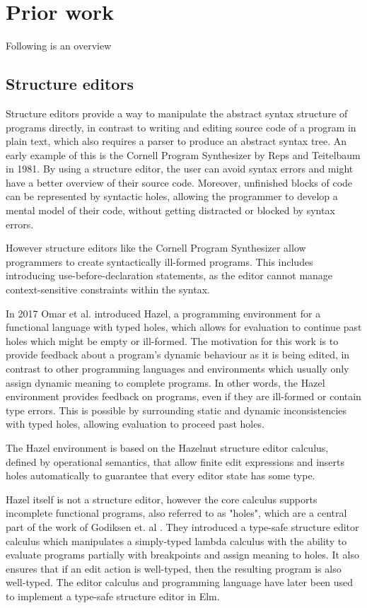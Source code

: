 \section{Prior work}
Following is an overview

\subsection{Structure editors}
Structure editors provide a way to manipulate the abstract syntax structure of programs directly, in contrast to writing and editing source code of a program in plain text, which also requires a parser to produce an abstract syntax tree. An early example of this is the Cornell Program Synthesizer by Reps and Teitelbaum\cite{timtom81} in 1981.
By using a structure editor, the user can avoid syntax errors and might have a better overview of their source code. Moreover, unfinished blocks of code can be represented by syntactic holes, allowing the programmer to develop a mental model of their code, without getting distracted or blocked by syntax errors.

However structure editors like the Cornell Program Synthesizer\cite{timtom81} allow programmers to create syntactically ill-formed programs. This includes introducing use-before-declaration statements, as the editor cannot manage context-sensitive constraints within the syntax.

In 2017 Omar et al. introduced Hazel\cite{omar}, a programming environment for a functional language with typed holes, which allows for evaluation to continue past holes which might be empty or ill-formed. The motivation for this work is to provide feedback about a program's dynamic behaviour as it is being edited, in contrast to other programming languages and environments which usually only assign dynamic meaning to complete programs. In other words, the Hazel environment\cite{omar} provides feedback on programs, even if they are ill-formed or contain type errors. This is possible by surrounding static and dynamic inconsistencies with typed holes, allowing evaluation to proceed past holes.

The Hazel environment is based on the Hazelnut structure editor calculus, defined by operational semantics, that allow finite edit expressions and inserts holes automatically to guarantee that every editor state has some type.

Hazel itself is not a structure editor, however the core calculus supports incomplete functional programs, also referred to as "holes", which are a central part of the work of Godiksen et. al \cite{godiksen}. They introduced a type-safe structure editor calculus which manipulates a simply-typed lambda calculus with the ability to evaluate programs partially with breakpoints and assign meaning to holes. It also ensures that if an edit action is well-typed, then the resulting program is also well-typed. The editor calculus and programming language have later been used to implement a type-safe structure editor in Elm\cite{KU-bach-missing-ref}.

